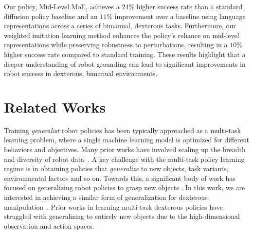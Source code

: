 \documentclass[conference,dvipsnames]{IEEEtran}
\newcommand{\MethodName}{Mid‐Level MoE}
\begin{document}
Our policy, \MethodName, achieves a $24\%$ higher success rate than a standard diffusion policy baseline and an $11\%$ improvement over a baseline using language representations across a series of bimanual, dexterous tasks. Furthermore, our weighted imitation learning method enhances the policy's reliance on mid-level representations while preserving robustness to perturbations, resulting in a $10\%$ higher success rate compared to standard training. These results highlight that a deeper understanding of robot grounding can lead to significant improvements in robot success in dexterous, bimanual environments. 

\section{Related Works}
Training \emph{generalist} robot policies has been typically approached as a multi-task learning problem, where a single machine learning model is optimized for different behaviors and objectives. Many prior works have involved scaling up the breadth and diversity of robot data~\cite{dasari2020robonetlargescalemultirobotlearning, ebert2021bridgedataboostinggeneralization, khazatsky2024droidlargescaleinthewildrobot, liu2024rdt1bdiffusionfoundationmodel, zhao2024alohaunleashedsimplerecipe, kareer2024egomimicscalingimitationlearning, nasiriany2024robocasalargescalesimulationeveryday}. A key challenge with the multi-task policy learning regime is in obtaining policies that \emph{generalize} to new objects, task variants, environmental factors and so on. Towards this, a significant body of work has focused on generalizing robot policies to grasp new objects \cite{Saxena2006RoboticGO, mahler2017dexnet20deeplearning, james2018taskembeddedcontrolnetworksfewshot}. In this work, we are interested in achieving a similar form of generalization for dexterous manipulation~\cite{chen2022humanlevelbimanualdexterousmanipulation, zhao2023learningfinegrainedbimanualmanipulation}. Prior works in learning multi-task dexterous policies have struggled with generalizing to entirely new objects due to the high-dimensional observation and action spaces.
\end{document}
